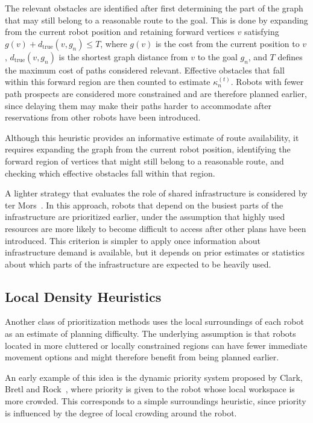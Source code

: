 The relevant obstacles are identified after first determining the part of the graph that may still
belong to a reasonable route to the goal. This is done by expanding from the current robot position
and retaining forward vertices \(v\) satisfying \(g(v) + d_{\mathrm{true}}(v,g_n) \leq T\), where \(g(v)\) is the cost from the current position to \(v\), \(d_{\mathrm{true}}(v,g_n)\) is the
shortest graph distance from \(v\) to the goal \(g_n\), and \(T\) defines the maximum cost of paths
considered relevant. Effective obstacles that fall within this forward region are then counted to
estimate \(\kappa_n^{(t)}\). Robots with fewer path prospects are considered more constrained and
are therefore planned earlier, since delaying them may make their paths harder to accommodate after
reservations from other robots have been introduced.

Although this heuristic provides an informative estimate of route availability, it requires expanding the graph from the current robot position, identifying the forward
region of vertices that might still belong to a reasonable route, and checking which effective
obstacles fall within that region. 

A lighter strategy that evaluates the role of shared infrastructure is considered by
ter Mors~\cite{termors2011evaluating}. In this approach, robots that depend on the busiest parts of
the infrastructure are prioritized earlier, under the assumption that highly used resources are more
likely to become difficult to access after other plans have been introduced. This criterion is simpler to apply once information about infrastructure demand is available, but it depends on prior estimates or statistics about which parts of the infrastructure are expected to be heavily used.


\subsection{Local Density Heuristics}
\hspace{\parindent}
Another class of prioritization methods uses the local surroundings of each robot as an estimate of
planning difficulty. The underlying assumption is that robots located in more cluttered or locally
constrained regions can have fewer immediate movement options and might therefore benefit from
being planned earlier.

An early example of this idea is the dynamic priority system proposed by Clark, Bretl and
Rock~\cite{clark2002dynamicpriority}, where priority is given to the robot whose local workspace is
more crowded. This corresponds to a simple surroundings heuristic, since priority is influenced by
the degree of local crowding around the robot.

